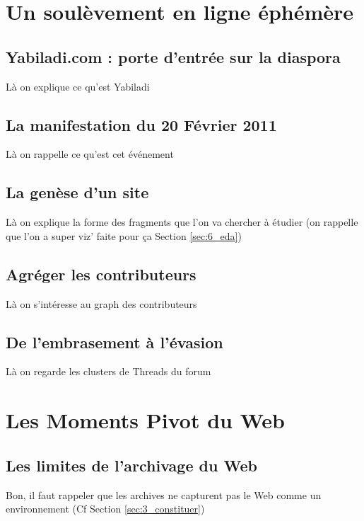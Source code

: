 \documentclass[symmetric,justified,marginals=raggedouter]{tufte-book}
\begin{document}
\section{Un soulèvement en ligne éphémère}

\subsection{Yabiladi.com : porte d'entrée sur la diaspora}

\noindent Là on explique ce qu'est Yabiladi

\subsection{La manifestation du 20 Février 2011}

\noindent Là on rappelle ce qu'est cet événement

\subsection{La genèse d'un site}

\noindent Là on explique la forme des fragments que l'on va chercher à étudier 
(on rappelle que l'on a super viz' faite pour ça Section \ref{sec:6_eda})

\subsection{Agréger les contributeurs}

\noindent Là on s'intéresse au graph des contributeurs

\subsection{De l'embrasement à l'évasion}

\noindent Là on regarde les clusters de Threads du forum

\section{Les Moments Pivot du Web}

\subsection{Les limites de l'archivage du Web}

\noindent Bon, il faut rappeler que les archives ne capturent pas le Web comme un environnement (Cf Section \ref{sec:3_constituer})
\end{document}
